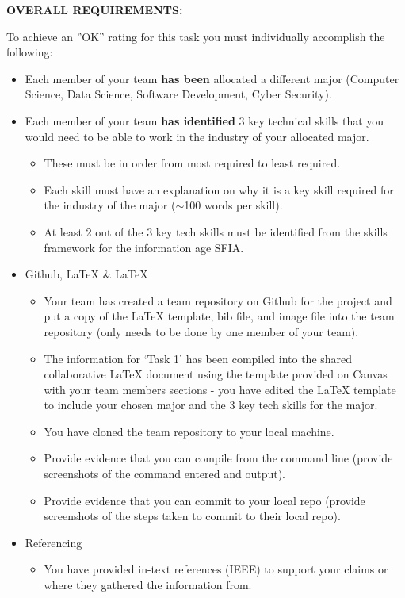\documentclass[a4paper, 11pt]{report}
\begin{document}
\textbf{OVERALL REQUIREMENTS:}

To achieve an ''OK'' rating for this task you must individually accomplish the following:
\begin{itemize}
\item Each member of your team \textbf{has been} allocated a different major (Computer Science, Data Science, Software Development, Cyber Security). 
\item Each member of your team \textbf{has identified} 3 key technical skills that you would need to be able to work in the industry of your allocated major.
	\begin{itemize}
	\item These must be in order from most required to least required.
	\item Each skill must have an explanation on why it is a key skill required for the industry of the major ($\sim$100 words per skill).
	\item At least 2 out of the 3 key tech skills must be identified from the skills framework for the information age SFIA.
	\end{itemize}
\item Github, LaTeX \& LaTeX
	\begin{itemize}
	\item Your team has created a team repository on Github for the project and put a copy of the LaTeX template, bib file, and image file into the team repository (only needs to be done by one member of your team).
	\item The information for ‘Task 1’ has been compiled into the shared collaborative LaTeX document using the template provided on Canvas with your team members sections - you have edited the LaTeX template to include your chosen major and the 3 key tech skills for the major.
	\item You have cloned the team repository to your local machine.
	\item Provide evidence that you can compile from the command line (provide screenshots of the command entered and output).
	\item Provide evidence that you can commit to your local repo (provide screenshots of the steps taken to commit to their local repo).
	\end{itemize}
\item Referencing
	\begin{itemize}
	\item You have provided in-text references (IEEE) to support your claims or where they gathered the information from.

\end{itemize}
\end{itemize}
\end{document}
